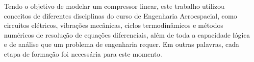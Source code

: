 Tendo o objetivo de modelar um compressor linear, este trabalho utilizou conceitos de diferentes disciplinas do curso de Engenharia Aeroespacial, como circuitos elétricos, vibrações mecânicas, ciclos termodinâmicos e métodos numéricos de resolução de equações diferenciais, além de toda a capacidade lógica e de análise que um problema de engenharia requer. Em outras palavras, cada etapa de formação foi necessária para este momento.
